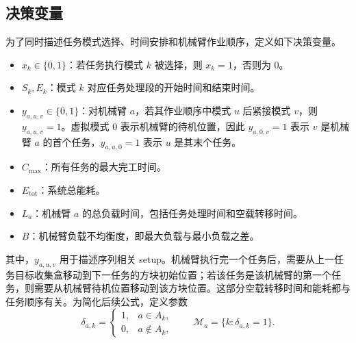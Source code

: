 \subsection{决策变量}

为了同时描述任务模式选择、时间安排和机械臂作业顺序，定义如下决策变量。

\begin{itemize}
    \item $x_k\in\{0,1\}$：若任务执行模式 $k$ 被选择，则 $x_k=1$，否则为 0。
    \item $S_k,E_k$：模式 $k$ 对应任务处理段的开始时间和结束时间。
    \item $y_{a,u,v}\in\{0,1\}$：对机械臂 $a$，若其作业顺序中模式 $u$ 后紧接模式 $v$，则 $y_{a,u,v}=1$。虚拟模式 $0$ 表示机械臂的待机位置，因此 $y_{a,0,v}=1$ 表示 $v$ 是机械臂 $a$ 的首个任务，$y_{a,u,0}=1$ 表示 $u$ 是其末个任务。
    \item $C_{\max}$：所有任务的最大完工时间。
    \item $E_{\mathrm{tot}}$：系统总能耗。
    \item $L_a$：机械臂 $a$ 的总负载时间，包括任务处理时间和空载转移时间。
    \item $B$：机械臂负载不均衡度，即最大负载与最小负载之差。
\end{itemize}

其中，$y_{a,u,v}$ 用于描述序列相关 setup。机械臂执行完一个任务后，需要从上一任务目标收集盒移动到下一任务的方块初始位置；若该任务是该机械臂的第一个任务，则需要从机械臂待机位置移动到该方块位置。这部分空载转移时间和能耗都与任务顺序有关。为简化后续公式，定义参数
\[
    \delta_{a,k}=\begin{cases}
    1, & a\in A_k,\\
    0, & a\notin A_k,
    \end{cases}
    \qquad
    \mathcal M_a=\{k:\delta_{a,k}=1\}.
\]

